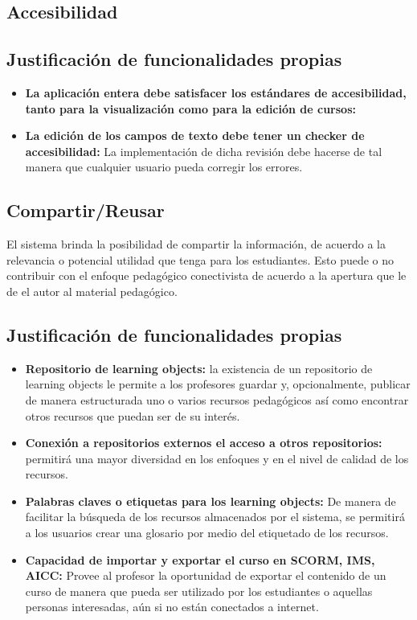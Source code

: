 \subsection{Accesibilidad}


\subsection*{Justificación de funcionalidades propias}

\begin{itemize}

\item \textbf{La aplicación entera debe satisfacer los estándares de accesibilidad, tanto para la visualización como para la edición de cursos:} 
\item \textbf{La edición de los campos de texto debe tener un checker de accesibilidad:} La implementación de dicha revisión debe hacerse de tal manera que cualquier usuario pueda corregir los errores.

\end{itemize}

\subsection{Compartir/Reusar}

El sistema brinda la posibilidad de compartir la información, de acuerdo a la relevancia o potencial utilidad que tenga para los estudiantes. Esto puede o no contribuir con el enfoque pedagógico conectivista de acuerdo a la apertura que le de el autor al material pedagógico.


\subsection*{Justificación de funcionalidades propias}

\begin{itemize}

\item \textbf{Repositorio de learning objects:} la existencia de un repositorio de learning objects le permite a los profesores guardar y, opcionalmente, publicar de manera estructurada uno o varios recursos pedagógicos así como encontrar otros recursos que puedan ser de su interés.
\item \textbf{Conexión a repositorios externos el acceso a otros repositorios:} permitirá una mayor diversidad en los enfoques y en el nivel de calidad de los recursos.
\item \textbf{Palabras claves o etiquetas para los learning objects:} De manera de facilitar la búsqueda de los recursos almacenados por el sistema, se permitirá a los usuarios crear una glosario por medio del etiquetado de los recursos.
\item \textbf{Capacidad de importar y exportar el curso en SCORM, IMS, AICC:} Provee al profesor la oportunidad de exportar el contenido de un curso de manera que pueda ser utilizado por los estudiantes o aquellas personas interesadas, aún si no están conectados a internet. 

\end{itemize}

